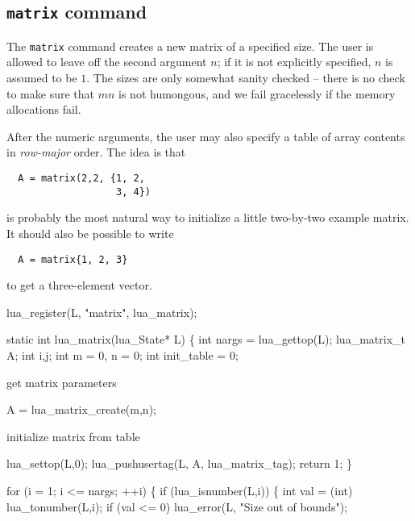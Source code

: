 \subsection{{\tt{}matrix} command}

The {\tt{}matrix} command creates a new matrix of a specified size.
The user is allowed to leave off the second argument $n$;
if it is not explicitly specified, $n$ is assumed to be $1$.
The sizes are only somewhat sanity checked -- there is no
check to make sure that $mn$ is not humongous, and we fail
gracelessly if the memory allocations fail.

After the numeric arguments, the user may also specify a table
of array contents in \emph{row-major} order.  The idea is that
\begin{verbatim}
  A = matrix(2,2, {1, 2,
                   3, 4})
\end{verbatim}
is probably the most natural way to initialize a little two-by-two
example matrix.  It should also be possible to write
\begin{verbatim}
  A = matrix{1, 2, 3}
\end{verbatim}
to get a three-element vector.

\nwenddocs{}\plusendmoddef
lua_register(L, "matrix", lua_matrix);
\nwendcode{}\nwdocspar

\nwenddocs{}\plusendmoddef
static int lua_matrix(lua_State* L)
\{
    int nargs = lua_gettop(L);
    lua_matrix_t A;
    int i,j;
    int m = 0, n = 0;
    int init_table = 0;

    \LA{}get \code{}matrix\edoc{} parameters~{\nwtagstyle{}}\RA{}

    A = lua_matrix_create(m,n);

    \LA{}initialize matrix from table~{\nwtagstyle{}}\RA{}

    lua_settop(L,0);
    lua_pushusertag(L, A, lua_matrix_tag);
    return 1;
\}

\nwendcode{}\nwdocspar

\nwenddocs{}\endmoddef
for (i = 1; i <= nargs; ++i) \{
    if (lua_isnumber(L,i)) \{
        int val = (int) lua_tonumber(L,i);
        if (val <= 0)
            lua_error(L, "Size out of bounds");

